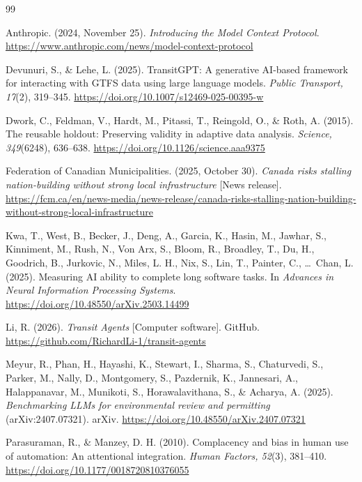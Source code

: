 \documentclass[11pt,a4paper]{article}
\begin{document}
\begin{thebibliography}{99}
\small\raggedright

Anthropic. (2024, November 25). \emph{Introducing the Model Context Protocol}. \url{https://www.anthropic.com/news/model-context-protocol}

Devunuri, S., \& Lehe, L. (2025). TransitGPT: A generative AI-based framework for interacting with GTFS data using large language models. \emph{Public Transport, 17}(2), 319--345. \url{https://doi.org/10.1007/s12469-025-00395-w}

Dwork, C., Feldman, V., Hardt, M., Pitassi, T., Reingold, O., \& Roth, A. (2015). The reusable holdout: Preserving validity in adaptive data analysis. \emph{Science, 349}(6248), 636--638. \url{https://doi.org/10.1126/science.aaa9375}

Federation of Canadian Municipalities. (2025, October 30). \emph{Canada risks stalling nation-building without strong local infrastructure} [News release]. \url{https://fcm.ca/en/news-media/news-release/canada-risks-stalling-nation-building-without-strong-local-infrastructure}

Kwa, T., West, B., Becker, J., Deng, A., Garcia, K., Hasin, M., Jawhar, S., Kinniment, M., Rush, N., Von Arx, S., Bloom, R., Broadley, T., Du, H., Goodrich, B., Jurkovic, N., Miles, L. H., Nix, S., Lin, T., Painter, C., \ldots\ Chan, L. (2025). Measuring AI ability to complete long software tasks. In \emph{Advances in Neural Information Processing Systems}. \url{https://doi.org/10.48550/arXiv.2503.14499}

Li, R. (2026). \emph{Transit Agents} [Computer software]. GitHub. \url{https://github.com/RichardLi-1/transit-agents}

Meyur, R., Phan, H., Hayashi, K., Stewart, I., Sharma, S., Chaturvedi, S., Parker, M., Nally, D., Montgomery, S., Pazdernik, K., Jannesari, A., Halappanavar, M., Munikoti, S., Horawalavithana, S., \& Acharya, A. (2025). \emph{Benchmarking LLMs for environmental review and permitting} (arXiv:2407.07321). arXiv. \url{https://doi.org/10.48550/arXiv.2407.07321}

Parasuraman, R., \& Manzey, D. H. (2010). Complacency and bias in human use of automation: An attentional integration. \emph{Human Factors, 52}(3), 381--410. \url{https://doi.org/10.1177/0018720810376055}


\end{thebibliography}
\end{document}
